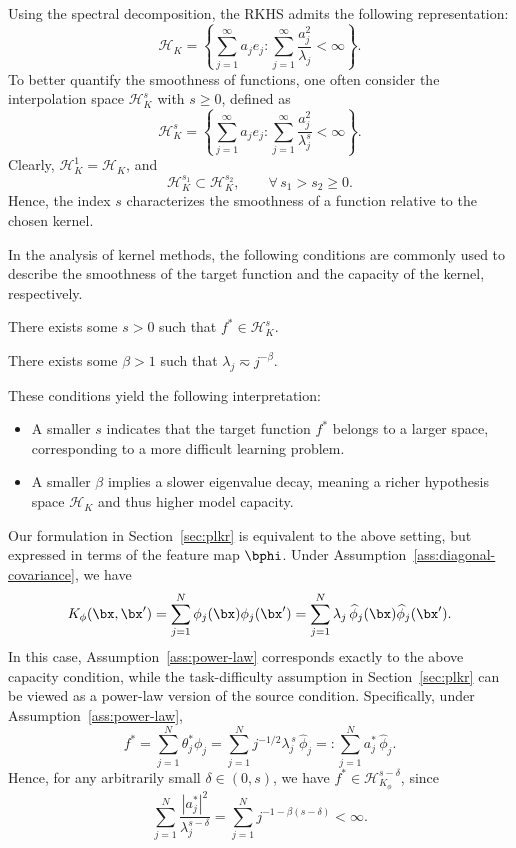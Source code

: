 Using the spectral decomposition, the RKHS admits the following representation:
\[
\mathcal{H}_K = \left\{\sum_{j=1}^{\infty} a_j e_j: \sum_{j=1}^{\infty} \frac{a_j^2}{\lambda_j} <
\infty\right\}.
\]
To better quantify the smoothness of functions, one often consider the interpolation space $\mathcal{H}_K^s$ with $s \ge 0$, defined as
\[
\mathcal{H}_K^s 
= \left\{
  \sum_{j=1}^{\infty} a_j e_j 
  : 
  \sum_{j=1}^{\infty} \frac{a_j^2}{\lambda_j^{s}} < \infty
\right\}.
\]
Clearly, $\mathcal{H}_K^1 = \mathcal{H}_K$, and
\[
\mathcal{H}_K^{s_1} \subset \mathcal{H}_K^{s_2}, 
\qquad \forall\, s_1 > s_2 \ge 0.
\]
Hence, the index $s$ characterizes the smoothness of a function relative to the chosen kernel.

In the analysis of kernel methods, the following conditions are commonly used to describe the smoothness of the target function and the capacity of the kernel, respectively.
\begin{assumption}
\label{assump:source-kernel}
There exists some $s>0$ such that $f^* \in \mathcal{H}_K^s$.
\end{assumption}

\begin{assumption}
\label{assump:capacity-kernel}
There exists some $\beta>1$ such that $\lambda_j \eqsim j^{-\beta}$.
\end{assumption}

These conditions yield the following interpretation:
\begin{itemize}
  \item A smaller $s$ indicates that the target function $f^*$ belongs to a larger space, corresponding to a more difficult learning problem.
  \item A smaller $\beta$ implies a slower eigenvalue decay, meaning a richer hypothesis space $\mathcal{H}_K$ and thus higher model capacity.
\end{itemize}

Our formulation in Section~\ref{sec:plkr} is equivalent to the above setting, but expressed in terms of the feature map $\bphi$.  
Under Assumption~\ref{ass:diagonal-covariance}, we have
\[
K_\phi(\bx,\bx') 
= \sum_{j=1}^N \phi_j(\bx)\phi_j(\bx') 
= \sum_{j=1}^N \lambda_j\, \widehat{\phi}_j(\bx)\widehat{\phi}_j(\bx').
\]
In this case, Assumption~\ref{ass:power-law} corresponds exactly to the above capacity condition, while the task-difficulty assumption in Section~\ref{sec:plkr} can be viewed as a power-law version of the source condition.  
Specifically, under Assumption~\ref{ass:power-law},
\[
  f^* 
  = \sum_{j=1}^N \theta_j^* \phi_j
  = \sum_{j=1}^N j^{-1/2}\lambda_j^{\,s}\, \widehat{\phi}_j
  =: \sum_{j=1}^N a_j^*\, \widehat{\phi}_j.
\]
Hence, for any arbitrarily small $\delta \in (0,s)$, we have $f^* \in \mathcal{H}_{K_\phi}^{s-\delta}$, since
\[
  \sum_{j=1}^N \frac{|a_j^*|^2}{\lambda_j^{s-\delta}}
  = \sum_{j=1}^N j^{-1-\beta(s-\delta)} 
  < \infty.
\]

